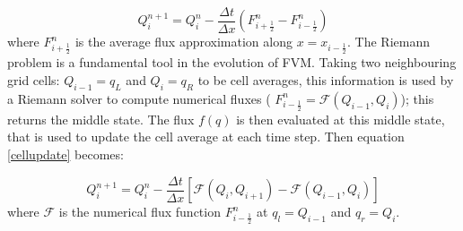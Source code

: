 \documentclass[11pt,a4paper]{article}
\newcommand{\donna}[1]{{\color{red}{#1}}}
\begin{document}
	\begin{equation}
		Q_{i}^{n+1} = Q_{i}^{n} - \frac{\Delta t}{\Delta x} (F_{i+\frac{1}{2}}^{n} - F_{i-\frac{1}{2}}^{n})
		\label{cellupdate}
	\end{equation}	
	where $F_{i+\frac{1}{2}}^{n} $ is the average flux approximation along $x=x_{i-\frac{1}{2}}$.
	The Riemann problem is a fundamental tool in the evolution of FVM. Taking two neighbouring grid cells: $Q_{i-1} = q_{L}$ and $Q_{i} = q_{R}$ to be cell averages, this information is used by a Riemann solver to compute numerical fluxes ( $F_{i-\frac{1}{2}}^{n} = \mathcal{F}(Q_{i-1} , Q_{i} )$); this returns the middle state.  The flux $f(q)$ is then evaluated at this middle state, that is used to update the cell average at each time step. Then equation \eqref{cellupdate} becomes:
	
	\begin{equation}
		Q_{i}^{n+1} = Q_{i}^{n} - \frac{\Delta t}{\Delta x} \left[ \mathcal{F}(Q_{i} , Q_{i+1} ) - \mathcal{F}(Q_{i-1} , Q_{i} ) \right]
		\label{cellupdat}
	\end{equation}
	where $\mathcal{F}$ is the  numerical flux function $F_{i-\frac{1}{2}}^{n}$ at $q_l = Q_{i-1}$  and $q_r = Q_{i}$.
	
\donna{The above  scheme is essentially the original Godunov scheme (cite Godunov) and is only first order accurate.  Different finite volume schemes will include higher order time stepping and or spatial terms to increase accuracy}
\end{document}
